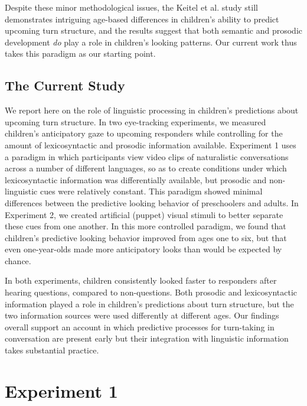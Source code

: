 \documentclass[authoryear, 12pt]{elsarticle}
\begin{document}
Despite these minor methodological issues, the Keitel et al. \citeyearpar{keitel2013} study still demonstrates intriguing age-based differences in children's ability to predict upcoming turn structure, and the results suggest that both semantic and prosodic development \textit{do} play a role in children's looking patterns. Our current work thus takes this paradigm as our starting point.

\subsection{The Current Study}

We report here on the role of linguistic processing in children's predictions about upcoming turn structure. In two eye-tracking experiments, we measured children's anticipatory gaze to upcoming responders while controlling for the amount of lexicosyntactic and prosodic information available. Experiment 1 uses a paradigm in which participants view video clips of naturalistic conversations across a number of different languages, so as to create conditions under which lexicosyntactic information was differentially available, but prosodic and non-linguistic cues were relatively constant. This paradigm showed minimal differences between the predictive looking behavior of preschoolers and adults. In Experiment 2, we created artificial (puppet) visual stimuli to better separate these cues from one another. In this more controlled paradigm, we found that children's predictive looking behavior improved from ages one to six, but that even one-year-olds made more anticipatory looks than would be expected by chance. 

In both experiments, children consistently looked faster to responders after hearing questions, compared to non-questions. Both prosodic and lexicosyntactic information played a role in children's predictions about turn structure, but the two information sources were used differently at different ages. Our findings overall support an account in which predictive processes for turn-taking in conversation are present early but their integration with linguistic information takes substantial practice. 

\section{Experiment 1}
\label{sec:exp1}
\end{document}
